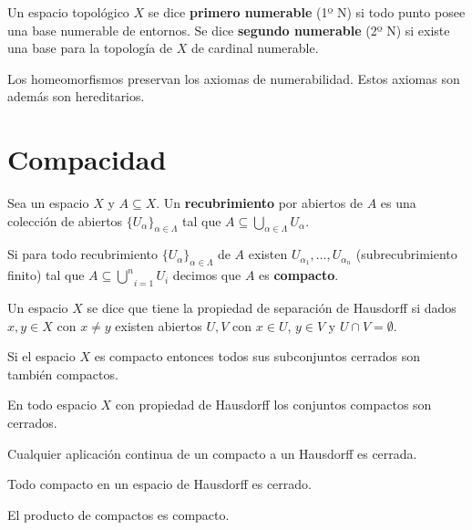 \documentclass[GTS.tex]{subfiles}
\begin{document}
\begin{defi}
Un espacio topológico $X$ se dice \textbf{primero numerable} (1º N) si todo punto posee una base numerable de entornos. Se dice \textbf{segundo numerable} (2º N) si existe una base para la topología de $X$ de cardinal numerable.
\end{defi}

\begin{prop}
Los homeomorfismos preservan los axiomas de numerabilidad. Estos axiomas son además son hereditarios.
\end{prop}

\section{Compacidad}
\begin{defi}Sea un espacio $X$ y $A\subseteq X$. Un \textbf{recubrimiento} por abiertos de $A$ es una colección de abiertos $\{U_\alpha\}_{\alpha\in\Lambda}$ tal que $A\subseteq\underset{\alpha\in\Lambda}{\bigcup}U_\alpha$.
\end{defi}
\begin{defi} Si para todo recubrimiento $\{U_\alpha\}_{\alpha\in\Lambda}$ de $A$ existen $U_{\alpha_1},\dots,U_{\alpha_n}$ (subrecubrimiento finito) tal que $A\subseteq\underset{i=1}{\overset{n}{\bigcup}}U_i$ decimos que $A$ es \textbf{compacto}.
\end{defi}
\begin{defi} Un espacio $X$ se dice que tiene la propiedad de separación de Hausdorff si dados $x,y\in X$ con $x\neq y$ existen abiertos $U,V$ con $x\in U$, $y\in V$ y $U\cap V=\emptyset$.
\end{defi}
Si el espacio $X$ es compacto entonces todos sus subconjuntos cerrados son también compactos.
\begin{prop} En todo espacio $X$ con propiedad de Hausdorff los conjuntos compactos son cerrados.
\end{prop}

\begin{prop}
Cualquier aplicación continua de un compacto a un Hausdorff es cerrada.
\end{prop}
\begin{coro}
Todo compacto en un espacio de Hausdorff es cerrado.
\end{coro}

\begin{teorema}[Tychonoff]
El producto de compactos es compacto.
\end{teorema}
\end{document}
